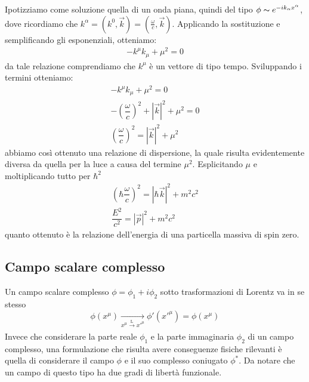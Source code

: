 Ipotizziamo come soluzione quella di un onda piana, quindi del tipo $\phi \thicksim e^{-ik_\alpha x^\alpha}$, dove ricordiamo che $k^\alpha=(k^0,\Vec{k})=(\frac{\omega}{c},\Vec{k})$. Applicando la sostituzione e semplificando gli esponenziali, otteniamo:
\begin{equation}
\begin{gathered}
    -k^\mu k_\mu+\mu^2=0
\end{gathered}
\end{equation}
da tale relazione comprendiamo che $k^\mu$ è un vettore di tipo tempo. Sviluppando i termini otteniamo:
\begin{equation}
\begin{gathered}
    -k^\mu k_\mu+\mu^2=0\\
    -\left(\dfrac{\omega}{c}\right)^2+|\Vec{k}|^2+\mu^2=0\\
    \left(\dfrac{\omega}{c}\right)^2=|\Vec{k}|^2+\mu^2
\end{gathered}
\end{equation}
abbiamo così ottenuto una relazione di dispersione, la quale risulta evidentemente diversa da quella per la luce a causa del termine $\mu^2$. Esplicitando $\mu$ e moltiplicando tutto per $\hbar^2$
\begin{equation}
\begin{gathered}
    \left(\hbar\dfrac{\omega}{c}\right)^2=|\hbar\Vec{k}|^2+m^2c^2\\
    \dfrac{E^2}{c^2}=|\Vec{p}|^2+m^2c^2
\end{gathered}
\end{equation}
quanto ottenuto è la relazione dell'energia di una particella massiva di spin zero.

\subsection{Campo scalare complesso}
Un campo scalare complesso $\phi=\phi_1+i\phi_2$ sotto trasformazioni di Lorentz va in se stesso
\begin{equation}
 \phi(x^\mu)\xrightarrow[\text{$x^\mu\xrightarrow[\text{}]{\text{L}}x'^{\mu}$}]{\text{}}\phi'(x'^{\mu})=\phi(x^\mu)
\end{equation}
Invece che considerare la parte reale $\phi_1$ e la parte immaginaria $\phi_2$ di un campo complesso, una formulazione che risulta avere conseguenze fisiche rilevanti è quella di considerare il campo $\phi$ e il suo complesso coniugato $\phi^*$.  Da notare che un campo di questo tipo ha due gradi di libertà funzionale.

